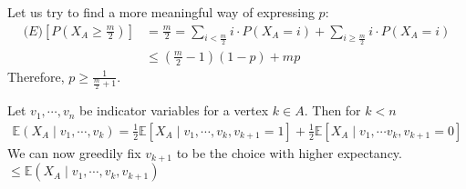 Let us try to find a more meaningful way of expressing $p$:
\begin{align}
    \mathbb(E)[P(X_A \geq \frac{m}{2})] & = \frac{m}{2} = \sum_{i < \frac{m}{2}}i \cdot P(X_A = i) + \sum_{i \geq \frac{m}{2}}i \cdot P(X_A = i) \\
                                        & \leq (\frac{m}{2} - 1)(1 - p) + mp
\end{align}
Therefore, $p \geq \frac{1}{\frac{m}{2} + 1}$.

Let $v_1, \cdots, v_n$ be indicator variables for a vertex $k \in A$. Then for $k < n$
\begin{align}
    \mathbb{E}(X_A \mid v_1, \cdots, v_k) = \frac{1}{2}\mathbb{E}[X_A \mid v_1, \cdots, v_k, v_{k+1} = 1] + \frac{1}{2}\mathbb{E}[X_A \mid v_1, \cdots v_k, v_{k+1} = 0]
\end{align}
We can now greedily fix $v_{k+1}$ to be the choice with higher expectancy.
$\leq \mathbb{E}(X_A \mid v_1, \cdots, v_k, v_{k+1})$
